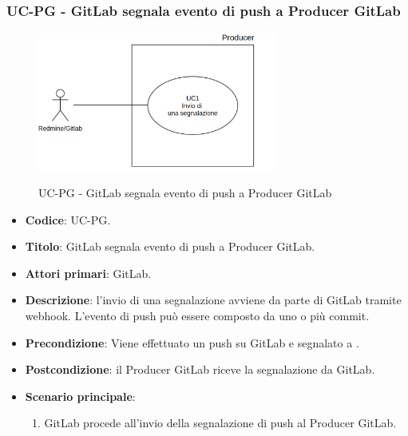 \subsubsection{UC\theuccount-PG - GitLab segnala evento di push a Producer GitLab}
	\begin{figure}[H]
		\centering
		\includegraphics[width=0.7\textwidth]{img/UC1.png}\\
		\caption{UC\theuccount-PG - GitLab segnala evento di push a Producer GitLab}
	\end{figure}
	\begin{itemize}
		\item \textbf{Codice}: UC\theuccount-PG.
		\item \textbf{Titolo}: GitLab segnala evento di push a Producer GitLab.
		\item \textbf{Attori primari}: GitLab.
		\item \textbf{Descrizione}: l'invio di una segnalazione avviene da parte di GitLab tramite webhook. L'evento di
		push può essere composto da uno o più commit.
		\item \textbf{Precondizione}: Viene effettuato un push su GitLab e segnalato a \progetto.
		\item \textbf{Postcondizione}: il Producer GitLab riceve la segnalazione da GitLab.
		\item \textbf{Scenario principale}: 
		\begin{enumerate}
			\item GitLab procede all'invio della segnalazione di push al Producer GitLab.
		\end{enumerate}
		
	\end{itemize}